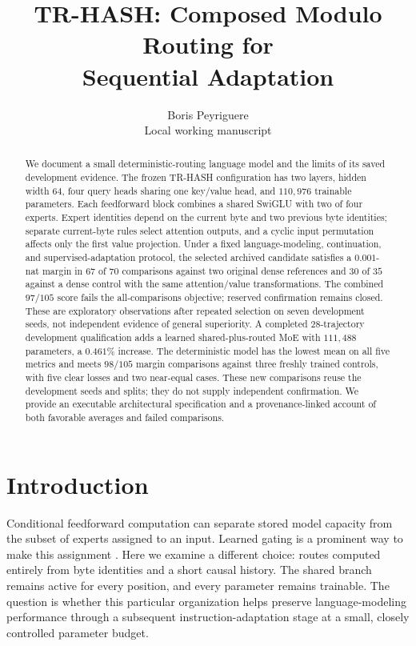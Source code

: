 \documentclass{article}
\title{TR-HASH: Composed Modulo Routing for\\Sequential Adaptation}
\author{Boris Peyriguere\\Local working manuscript}
\date{}
\newcommand{\Source}{\textsc{TR-HASH}}
\begin{document}
\maketitle

\begin{abstract}
We document a small deterministic-routing language model and the limits of its saved development evidence. The frozen \Source{} configuration has two layers, hidden width $64$, four query heads sharing one key/value head, and $110{,}976$ trainable parameters. Each feedforward block combines a shared SwiGLU with two of four experts. Expert identities depend on the current byte and two previous byte identities; separate current-byte rules select attention outputs, and a cyclic input permutation affects only the first value projection. Under a fixed language-modeling, continuation, and supervised-adaptation protocol, the selected archived candidate satisfies a $0.001$-nat margin in $67$ of $70$ comparisons against two original dense references and $30$ of $35$ against a dense control with the same attention/value transformations. The combined $97/105$ score fails the all-comparisons objective; reserved confirmation remains closed. These are exploratory observations after repeated selection on seven development seeds, not independent evidence of general superiority. A completed $28$-trajectory development qualification adds a learned shared-plus-routed MoE with $111{,}488$ parameters, a $0.461\%$ increase. The deterministic model has the lowest mean on all five metrics and meets $98/105$ margin comparisons against three freshly trained controls, with five clear losses and two near-equal cases. These new comparisons reuse the development seeds and splits; they do not supply independent confirmation. We provide an executable architectural specification and a provenance-linked account of both favorable averages and failed comparisons.
\end{abstract}

\section{Introduction}
Conditional feedforward computation can separate stored model capacity from the subset of experts assigned to an input. Learned gating is a prominent way to make this assignment \citep{shazeer2017moe,fedus2022switch}. Here we examine a different choice: routes computed entirely from byte identities and a short causal history. The shared branch remains active for every position, and every parameter remains trainable. The question is whether this particular organization helps preserve language-modeling performance through a subsequent instruction-adaptation stage at a small, closely controlled parameter budget.
\end{document}
